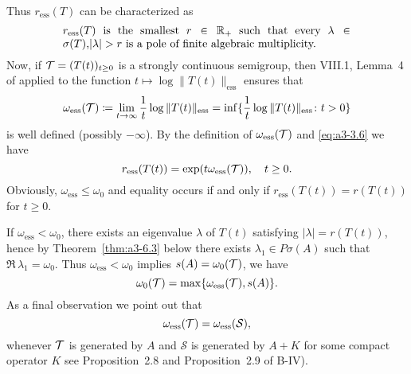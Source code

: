 \begin{example}
Thus $r_{\text{ess}}(T)$ can be characterized as
\begin{equation}\label{eq:a3-3.8}
\begin{minipage}{.75\textwidth}
$r_{\text{ess}}(T) $ is the smallest   $r \in \R_{+}$    such that every   
$\lambda \in \sigma(T)$,$ |\lambda| > r $  is a pole of finite algebraic multiplicity. 
\end{minipage}
\end{equation}
Now, if $\mathcal{T} = (T(t))_{t \geq 0}$ is a strongly continuous semigroup, then VIII.1, Lemma~4 of \citet{dunfordschwartz:1958} applied to the function $t \mapsto \log \|T(t)\|_{\text{ess}}$ ensures that
\begin{equation}\label{eq:a3-3.9}
\omega_{\text{ess}}(\mathcal{T}) \coloneqq \lim_{t \to \infty} \frac{1}{t} \log\|T(t)\|_{\text{ess}} = \inf \{\frac{1}{t} \log\|T(t)\|_{\text{ess}} \colon t > 0\}
\end{equation}
is well defined (possibly $-\infty$).
By the definition of $\omega_{\text{ess}}(\mathcal{T})$ and \eqref{eq:a3-3.6} we have
\begin{equation}\label{eq:a3-3.10}
r_{\text{ess}}(T(t)) = \exp(t\omega_{\text{ess}}(\mathcal{T})), \quad t \geq 0 .
\end{equation}
Obviously, $\omega_{\text{ess}} \leq \omega_{0}$ and equality occurs if and only if $r_{\text{ess}}(T(t)) = r(T(t))$ for $t \geq 0$.

If $\omega_{\text{ess}} < \omega_{0}$, there exists an eigenvalue $\lambda$ of $T(t)$ satisfying $|\lambda| = r(T(t))$, hence by Theorem~\ref{thm:a3-6.3} below there exists $\lambda_{1} \in P\sigma(A)$ such that $\Re\,\lambda_{1} = \omega_{0}$.
Thus $\omega_{\text{ess}} < \omega_{0}$ implies $s(A) = \omega_{0}(\mathcal{T})$, \ie we have
\begin{equation}\label{eq:a3-3.11}
\omega_{0}(\mathcal{T}) = \max\{\omega_{\text{ess}}(\mathcal{T}),s(A)\} .
\end{equation}
As a final observation we point out that
\begin{equation}\label{eq:a3-3.12}
\omega_{\text{ess}}(\mathcal{T}) = \omega_{\text{ess}}({\mathcal{S}}) ,
\end{equation}
whenever $\mathcal{T}$ is generated by $A$ and $\mathcal{S}$ is generated by $A + K$ for some compact operator $K$ 
see Proposition~2.8  and Proposition~2.9 of B-IV).
\end{example}

